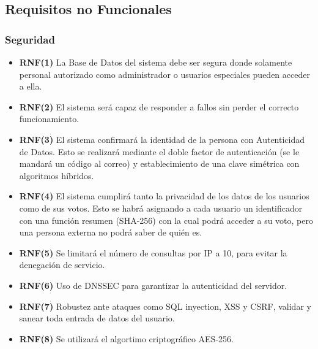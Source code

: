 \documentclass{article}
\begin{document}
    \subsection{Requisitos no Funcionales}
         \subsubsection{Seguridad}
        \begin{itemize}
            \item  \textbf{RNF(1)}  La Base de Datos del sistema debe ser segura donde solamente personal autorizado como administrador o usuarios especiales pueden acceder a ella.
             \item  \textbf{RNF(2)} El sistema será capaz de responder a fallos sin perder el correcto funcionamiento.
             \item  \textbf{RNF(3)} El sistema confirmará la identidad de la persona con Autenticidad de Datos. Esto se realizará mediante el doble factor de autenticación (se le mandará un código al correo) y establecimiento de una 
            clave simétrica con algoritmos híbridos.
             \item  \textbf{RNF(4)} El sistema cumplirá tanto la privacidad de los datos de los usuarios como de sus votos. Esto
            se habrá asignando a cada usuario un identificador con una función resumen (SHA-256) con la cual
            podrá acceder a su voto, pero una persona externa no podrá saber de quién es.
             \item  \textbf{RNF(5)} Se limitará el número de consultas por IP a 10, para evitar la denegación de servicio.
             \item  \textbf{RNF(6)} Uso de DNSSEC para garantizar la autenticidad del servidor.
             \item  \textbf{RNF(7)} Robustez ante ataques como SQL inyection, XSS y CSRF, validar y sanear toda entrada 
            de datos del usuario.
             \item  \textbf{RNF(8)} Se utilizará el algortimo criptográfico AES-256.
        \end{itemize}
    
\end{document}
